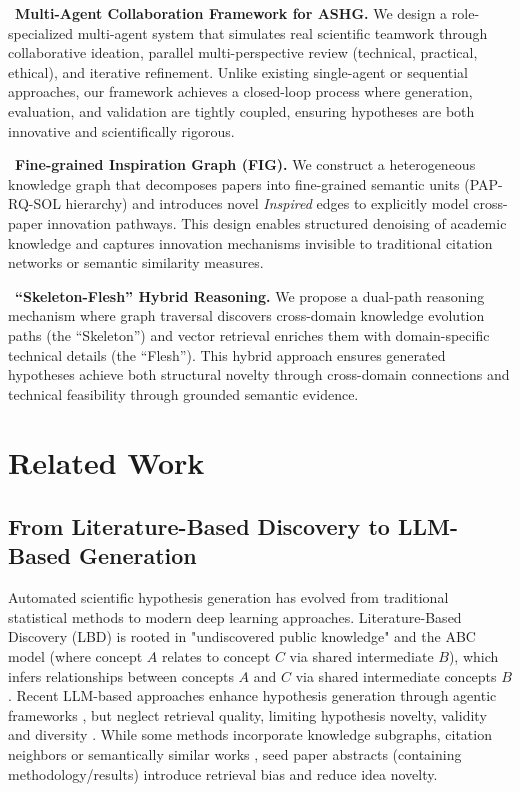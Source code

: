 \documentclass[runningheads]{llncs}
\begin{document}
\noindent\textbullet\ \textbf{Multi-Agent Collaboration Framework for ASHG.} We design a role-specialized multi-agent system that simulates real scientific teamwork through collaborative ideation, parallel multi-perspective review (technical, practical, ethical), and iterative refinement. Unlike existing single-agent or sequential approaches, our framework achieves a closed-loop process where generation, evaluation, and validation are tightly coupled, ensuring hypotheses are both innovative and scientifically rigorous.

\noindent\textbullet\ \textbf{Fine-grained Inspiration Graph (FIG).} We construct a heterogeneous knowledge graph that decomposes papers into fine-grained semantic units (PAP-RQ-SOL hierarchy) and introduces novel \textit{Inspired} edges to explicitly model cross-paper innovation pathways. This design enables structured denoising of academic knowledge and captures innovation mechanisms invisible to traditional citation networks or semantic similarity measures.

\noindent\textbullet\ \textbf{``Skeleton-Flesh'' Hybrid Reasoning.} We propose a dual-path reasoning mechanism where graph traversal discovers cross-domain knowledge evolution paths (the ``Skeleton'') and vector retrieval enriches them with domain-specific technical details (the ``Flesh''). This hybrid approach ensures generated hypotheses achieve both structural novelty through cross-domain connections and technical feasibility through grounded semantic evidence.


\section{Related Work}

\subsection{From Literature-Based Discovery to LLM-Based Generation}
Automated scientific hypothesis generation has evolved from traditional statistical methods to modern deep learning approaches. Literature-Based Discovery (LBD) is rooted in "undiscovered public knowledge" and the ABC model (where concept $A$ relates to concept $C$ via shared intermediate $B$), which infers relationships between concepts $A$ and $C$ via shared intermediate concepts $B$ \cite{swanson1986fish,swanson1986undiscovered}. Recent LLM-based approaches enhance hypothesis generation through agentic frameworks \cite{wang2024research,si2024large,baek2025research}, but neglect retrieval quality, limiting hypothesis novelty, validity and diversity \cite{lewis2020retrieval,zhao2024survey,li2024b}. While some methods incorporate knowledge subgraphs, citation neighbors or semantically similar works \cite{wang2024research,li2024b,baek2025research}, seed paper abstracts (containing methodology/results) introduce retrieval bias and reduce idea novelty.
\end{document}
